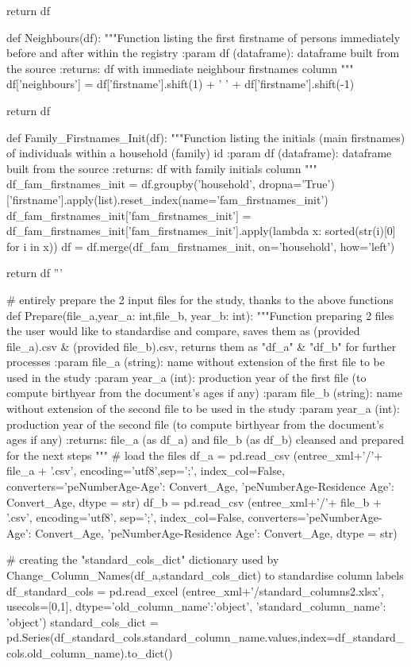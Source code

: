 \documentclass[a4paper,12pt,twoside]{book}
\begin{document}
\begin{python}
  return df

def Neighbours(df):
  """Function listing the first firstname of persons immediately before and after within the registry
  :param df (dataframe): dataframe built from the source
  :returns: df with immediate neighbour firstnames column
  """ 
  df['neighbours'] = df['firstname'].shift(1) + ' ' + df['firstname'].shift(-1)

  return df

def Family_Firstnames_Init(df):
  """Function listing the initials (main firstnames) of individuals within a household (family) id
  :param df (dataframe): dataframe built from the source
  :returns: df with family initials column
  """
  df_fam_firstnames_init = df.groupby('household', dropna='True')['firstname'].apply(list).reset_index(name='fam_firstnames_init')
  df_fam_firstnames_init['fam_firstnames_init'] = df_fam_firstnames_init['fam_firstnames_init'].apply(lambda x: sorted(str(i)[0] for i in x))
  df = df.merge(df_fam_firstnames_init, on='household', how='left')
  
  return df
'''


# entirely prepare the 2 input files for the study, thanks to the above functions
def Prepare(file_a,year_a: int,file_b, year_b: int):
  """Function preparing 2 files the user would like to standardise and compare, saves them as (provided file_a).csv & (provided file_b).csv, returns them as "df_a" & "df_b" for further processes
    :param file_a (string): name without extension of the first file to be used in the study
    :param year_a (int): production year of the first file (to compute birthyear from the document's ages if any)
    :param file_b (string): name without extension of the second file to be used in the study
    :param year_a (int): production year of the second file (to compute birthyear from the document's ages if any)
    :returns: file_a (as df_a) and file_b (as df_b) cleansed and prepared for the next steps
  """
  # load the files
  df_a = pd.read_csv (entree_xml+'/'+ file_a + '.csv', encoding='utf8',sep=';', index_col=False, converters={'peNumberAge-Age': Convert_Age, 'peNumberAge-Residence Age': Convert_Age}, dtype = str)
  df_b = pd.read_csv (entree_xml+'/'+ file_b + '.csv', encoding='utf8', sep=';', index_col=False, converters={'peNumberAge-Age': Convert_Age, 'peNumberAge-Residence Age': Convert_Age}, dtype = str)
  
  # creating the "standard_cols_dict" dictionary used by Change_Column_Names(df_a,standard_cols_dict) to standardise column labels
  df_standard_cols = pd.read_excel (entree_xml+'/standard_columns2.xlsx', usecols=[0,1], dtype={'old_column_name':'object', 'standard_column_name': 'object'})
  standard_cols_dict = pd.Series(df_standard_cols.standard_column_name.values,index=df_standard_cols.old_column_name).to_dict()


\end{python}
\end{document}
